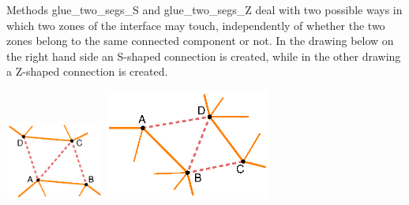 Methods {\codett glue\_two\_segs\_S} and
{\codett glue\_two\_segs\_Z} deal with two possible ways in which two
zones of the interface may touch,
independently of whether the two zones belong to the same connected component or not.
In the drawing below on the right hand side an S-shaped connection is created,
while in the other drawing a Z-shaped connection is created.


{ 
  \centerline{\includegraphics[width=32mm]{connect-S.eps}
  \hskip10mm \includegraphics[width=55mm]{connect-Z.eps}} }

